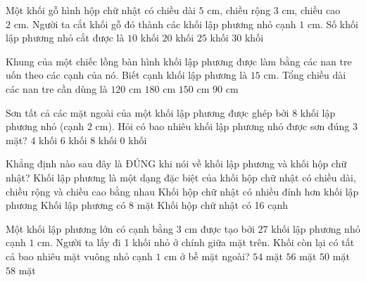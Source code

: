 \begin{ex} %
Một khối gỗ hình hộp chữ nhật có chiều dài $5\text{ cm}$, chiều rộng $3\text{ cm}$, chiều cao $2\text{ cm}$. Người ta cắt khối gỗ đó thành các khối lập phương nhỏ cạnh $1\text{ cm}$. Số khối lập phương nhỏ cắt được là
\choice
{$10$ khối}
{$20$ khối}
{$25$ khối}
{\True $30$ khối}
\end{ex}

\begin{ex} %
Khung của một chiếc lồng bàn hình khối lập phương được làm bằng các nan tre uốn theo các cạnh của nó. Biết cạnh khối lập phương là $15\text{ cm}$. Tổng chiều dài các nan tre cần dùng là
\choice
{$120\text{ cm}$}
{\True $180\text{ cm}$}
{$150\text{ cm}$}
{$90\text{ cm}$}
\end{ex}

\begin{ex} %
Sơn tất cả các mặt ngoài của một khối lập phương được ghép bởi 8 khối lập phương nhỏ (cạnh $2\text{ cm}$). Hỏi có bao nhiêu khối lập phương nhỏ được sơn đúng 3 mặt?
\choice
{$4$ khối}
{$6$ khối}
{\True $8$ khối}
{$0$ khối}
\end{ex}

\begin{ex} %
Khẳng định nào sau đây là ĐÚNG khi nói về khối lập phương và khối hộp chữ nhật?
\choice
{\True Khối lập phương là một dạng đặc biệt của khối hộp chữ nhật có chiều dài, chiều rộng và chiều cao bằng nhau}
{Khối hộp chữ nhật có nhiều đỉnh hơn khối lập phương}
{Khối lập phương có 8 mặt}
{Khối hộp chữ nhật có 16 cạnh}
\end{ex}

\begin{ex} %
Một khối lập phương lớn có cạnh bằng $3\text{ cm}$ được tạo bởi 27 khối lập phương nhỏ cạnh $1\text{ cm}$. Người ta lấy đi 1 khối nhỏ ở chính giữa mặt trên. Khối còn lại có tất cả bao nhiêu mặt vuông nhỏ cạnh $1\text{ cm}$ ở bề mặt ngoài?
\choice
{$54$ mặt}
{$56$ mặt}
{$50$ mặt}
{\True $58$ mặt}
\end{ex}


